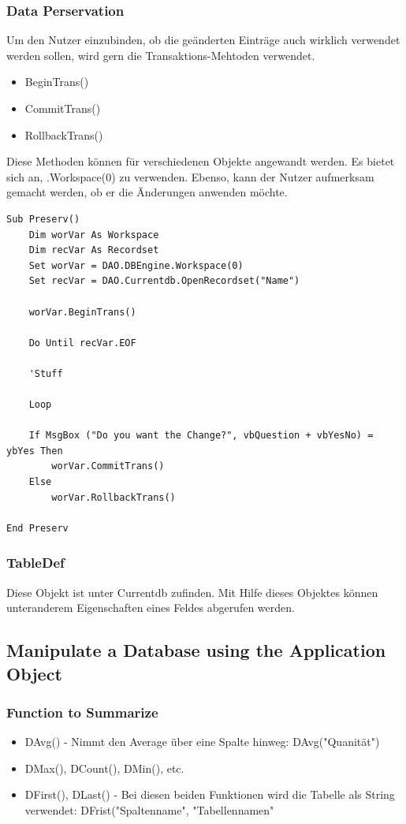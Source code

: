 \subsubsection{Data Perservation} 
Um den Nutzer einzubinden, ob die geänderten Einträge auch wirklich verwendet werden sollen, wird gern die Transaktions-Mehtoden verwendet.
\begin{itemize}
\item BeginTrans()
\item CommitTrans()
\item RollbackTrans()
\end{itemize}
Diese Methoden können für verschiedenen Objekte angewandt werden. Es bietet sich an, .Workspace(0) zu verwenden. Ebenso, kann der Nutzer aufmerksam gemacht werden, ob er die Änderungen anwenden möchte.
\begin{lstlisting}[style=VBA]
Sub Preserv()
	Dim worVar As Workspace
	Dim recVar As Recordset
	Set worVar = DAO.DBEngine.Workspace(0)
	Set recVar = DAO.Currentdb.OpenRecordset("Name")
	
	worVar.BeginTrans()
	
	Do Until recVar.EOF
	
	'Stuff
	
	Loop
	
	If MsgBox ("Do you want the Change?", vbQuestion + vbYesNo) = ybYes Then
		worVar.CommitTrans()
	Else
		worVar.RollbackTrans()	
	
End Preserv
\end{lstlisting} 
\subsubsection{TableDef}
Diese Objekt ist unter Currentdb zufinden. Mit Hilfe dieses Objektes können unteranderem Eigenschaften eines Feldes abgerufen werden.

\subsection{Manipulate a Database using the Application Object}
\subsubsection{Function to Summarize}
\begin{itemize}
\item DAvg() - Nimmt den Average über eine Spalte hinweg: DAvg("Quanität") 
\item DMax(), DCount(), DMin(), etc.
\item DFirst(), DLast() - Bei diesen beiden Funktionen wird die Tabelle als String verwendet: DFrist("Spaltenname", "Tabellennamen"
\end{itemize}   
